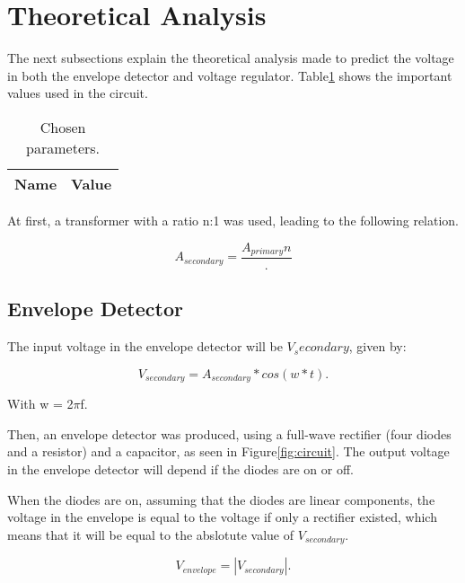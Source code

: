 \section{Theoretical Analysis}
\label{sec:analysis}
\par The next subsections explain the theoretical analysis made to predict the voltage in both the envelope detector and voltage regulator. Table\ref{tab:dados} shows the important values used in the circuit.


\begin{table}[h]
  \centering
  \begin{tabular}{|l|r|}
    \hline    
    {\bf Name} & {\bf Value}\\ \hline
    
  \end{tabular}
  \caption{Chosen parameters.}
  \label{tab:dados}
\end{table}


\par At first, a transformer with a ratio n:1 was used, leading to the following relation.

\begin{equation}
  A_{secondary} = \frac {A_{primary}{n}}.
  \label{eq:transformer}
\end{equation}

\subsection{Envelope Detector}
\par The input voltage in the envelope detector will be $V_secondary$, given by:

\begin{equation}
  V_{secondary} = A_{secondary}*cos(w*t).
  \label{eq:transformer}
\end{equation}

With w = 2$\pi$f.

\par Then, an envelope detector was produced, using a full-wave rectifier (four diodes and a resistor) and a capacitor, as seen in Figure\ref{fig:circuit}.
 The output voltage in the envelope detector will depend if the diodes are on or off. 
\par When the diodes are on, assuming that the diodes are linear components, the voltage in the envelope is equal to the voltage if only a rectifier existed, which means that it will be equal to the abslotute value of $V_{secondary}$. 

\begin{equation}
  V_{envelope} = |V_{secondary}|.
  \label{eq:veon}
\end{equation}

